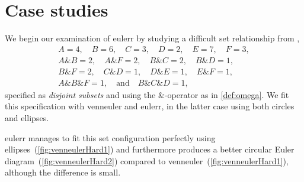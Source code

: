 \documentclass[
  oneside,
  openany,
  numbers=noendperiod,
  parskip=half,
  bibliography=totoc
]{scrbook}\usepackage[]{graphicx}\usepackage{xcolor}
\newcommand{\pkg}[1]{{\fontseries{b}\selectfont #1}}
\begin{document}
\section{Case studies}
\label{sec:caseStudies}

We begin our examination of \pkg{eulerr} by studying a difficult set
relationship from \citet{Wilkinson_2012},
\begin{gather*}
A = 4, \quad B = 6, \quad C = 3, \quad D = 2, \quad E = 7, \quad F = 3,\\
A\& B = 2, \quad A\&F = 2, \quad B\& C = 2, \quad B\&D = 1,\\
B\& F = 2, \quad C\&D = 1, \quad D\& E = 1, \quad E\&F = 1,\\
A\&B\&F = 1,\quad \text{and} \quad B\&C\&D = 1,\end{gather*}
specified as \emph{disjoint subsets} and using the $\&$-operator
as in \cref{def:omega}.
We fit this
specification with \pkg{venneuler} and \pkg{eulerr}, in the latter case using
both circles and ellipses.

\pkg{eulerr} manages to fit this set
configuration perfectly using ellipses~(\cref{fig:venneulerHard1}) and furthermore
produces a better circular Euler diagram~(\cref{fig:venneulerHard2}) compared to
\pkg{venneuler}~(\cref{fig:venneulerHard1}), although the
difference is small.
\end{document}
